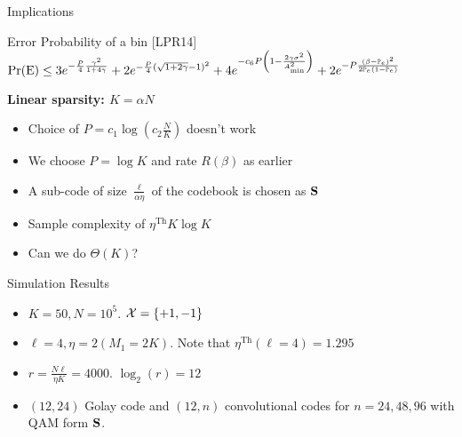 \begin{frame}{Implications}
\begin{block}{Error Probability of a bin [LPR14]}
$\text{Pr(E)}\leq 3e^{-\frac{P}{4}\frac{\gamma^2}{1+4 \gamma}}+2e^{-\frac{P}{4}(\sqrt{1+2\gamma}-1)^2}+4e^{-c_6 P\left(1-\frac{2\gamma\sigma^2}{A^{2}_{\text{min}}}\right)}+2e^{-P\frac{\left(\beta-\mathbb{P}_{e}\right)^2}{2\mathbb{P}_{e}(1-\mathbb{P}_{e})}}$
\end{block}

\vspace{2ex}
\begin{description}
    \item [\textbf{Linear sparsity: $K=\alpha N$}]
\end{description}
\begin{itemize}
\item Choice of $P=c_{1}\log\left(c_2 \frac{N}{K}\right)$ doesn't work
\item We choose $P=\log K$ and rate $R(\beta)$ as earlier
\item A sub-code of size $\frac{\ell}{\alpha\eta}$ of the codebook is chosen as $\mathbf{S}$
\item Sample complexity of $\eta^{\text{Th}}K\log K$
\item Can we do $\Theta(K)$?
\end{itemize}
\end{frame}

\begin{frame}{Simulation Results}
\begin{itemize}
\item $K=50, N=10^5$. $\mathcal{X}=\{+1,-1\}$
\item $\ell=4, \eta =2 (M_1 =2K)$. Note that $\eta^{\text{Th}}(\ell=4)=1.295$
\item $r=\frac{N\ell}{\eta K}=4000$. $\log_2(r)=12$
\item $(12,24)$ Golay code and $(12,n)$ convolutional codes for $n=24,48,96$ with QAM form $\mathbf{S}$.
\end{itemize}

\begin{figure}
\resizebox{0.65\textwidth}{!}{
\begin{centering}

\end{centering}
}
\end{figure}
\end{frame}